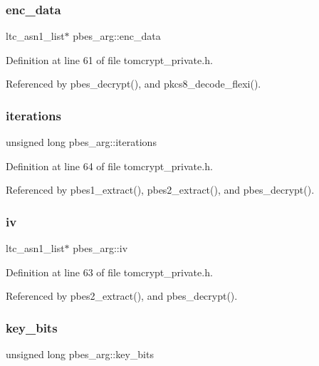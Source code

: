 \subsubsection{\texorpdfstring{enc\_data}{enc\_data}}
{\footnotesize\ttfamily ltc\+\_\+asn1\+\_\+list$\ast$ pbes\+\_\+arg\+::enc\+\_\+data}



Definition at line 61 of file tomcrypt\+\_\+private.\+h.



Referenced by pbes\+\_\+decrypt(), and pkcs8\+\_\+decode\+\_\+flexi().

\mbox{\label{structpbes__arg_a78b52a8d8572e6947ebe909b51490ec6}} 
\subsubsection{\texorpdfstring{iterations}{iterations}}
{\footnotesize\ttfamily unsigned long pbes\+\_\+arg\+::iterations}



Definition at line 64 of file tomcrypt\+\_\+private.\+h.



Referenced by pbes1\+\_\+extract(), pbes2\+\_\+extract(), and pbes\+\_\+decrypt().

\mbox{\label{structpbes__arg_aeecdb7fb21b9beacfa5adf1f715eb9fd}} 
\subsubsection{\texorpdfstring{iv}{iv}}
{\footnotesize\ttfamily ltc\+\_\+asn1\+\_\+list$\ast$ pbes\+\_\+arg\+::iv}



Definition at line 63 of file tomcrypt\+\_\+private.\+h.



Referenced by pbes2\+\_\+extract(), and pbes\+\_\+decrypt().

\mbox{\label{structpbes__arg_ac59e419107215d6c89e2d9789a0c49f4}} 
\subsubsection{\texorpdfstring{key\_bits}{key\_bits}}
{\footnotesize\ttfamily unsigned long pbes\+\_\+arg\+::key\+\_\+bits}



